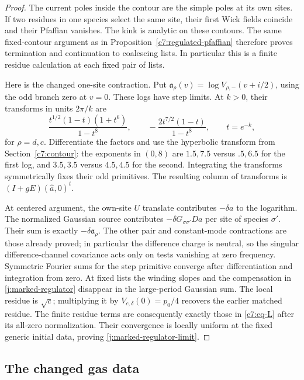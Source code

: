 \begin{proof}
The current poles inside the contour are the simple poles at its
own sites. If two residues in one species select the same site,
their first Wick fields coincide and their Pfaffian vanishes.
The kink is analytic on these contours. The same fixed-contour
argument as in Proposition~\ref{c7:regulated-pfaffian} therefore
proves termination and continuation to coalescing lists. In
particular this is a finite residue calculation at each fixed
pair of lists.

Here is the changed one-site contraction. Put
$\mathfrak a_\rho(v)=\log V_{\rho,-}(v+i/2)$, using the odd
branch zero at $v=0$. These logs have step limits. At $k>0$,
their transforms in units $2\pi/k$ are
\[
 \frac{t^{1/2}(1-t)(1+t^6)}{1-t^8},\qquad
 -\frac{2t^{7/2}(1-t)}{1-t^8},\qquad t=e^{-k},
\]
for $\rho=d,c$. Differentiate the factors and use the
hyperbolic transform from Section~\ref{c7:contour}: the exponents
in $(0,8)$ are $1.5,7.5$ versus $.5,6.5$ for the first log, and
$3.5,3.5$ versus $4.5,4.5$ for the second. Integrating the
transforms symmetrically fixes their odd primitives. The resulting
column of transforms is
$(I+gE)(\widehat a,0)^t$.

At centered argument, the own-site $U$ translate contributes
$-\delta a$ to the logarithm. The normalized Gaussian source
contributes $-\delta G_{\sigma\sigma'}D a$ per site of species
$\sigma'$. Their sum is exactly $-\delta\mathfrak a_\rho$.
The other pair and constant-mode contractions are those already
proved; in particular the difference charge is neutral, so the
singular difference-channel covariance acts only on tests
vanishing at zero frequency. Symmetric Fourier sums for the step
primitive converge after differentiation and integration from
zero. At fixed lists the winding slopes and the compensation in
\eqref{j:marked-regulator} disappear in the large-period
Gaussian sum. The local residue is $\sqrt c$; multiplying it by
$V_{c,\delta}(0)=p_0/4$ recovers the earlier matched residue.
The finite residue terms are consequently exactly those in
\eqref{c7:eq-L} after its all-zero normalization. Their convergence
is locally uniform at the fixed generic initial data, proving
\eqref{j:marked-regulator-limit}.
\end{proof}

\subsection{The changed gas data}

